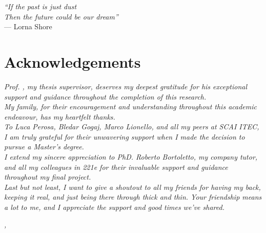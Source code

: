 \cleardoublepage
{}
{}

\begin{flushright}{
    \slshape
    ``If the past is just dust \\
    Then the future could be our dream''} \\
    \medskip
    --- Lorna Shore
\end{flushright}


\bigskip

\begingroup
\let\clearpage\relax
\let\cleardoublepage\relax
\let\cleardoublepage\relax

\chapter*{Acknowledgements}

\noindent \textit{Prof. \myProf, my thesis supervisor, deserves my deepest gratitude for his exceptional support and guidance throughout the completion of this research.}\\
\noindent \textit{My family, for their encouragement and understanding throughout this academic endeavour, has my heartfelt thanks.}\\
\noindent \textit{To Luca Perosa, Bledar Gogaj, Marco Lionello, and all my peers at SCAI ITEC, I am truly grateful for their unwavering support when I made the decision to pursue a Master’s degree.}\\
\noindent \textit{I extend my sincere appreciation to PhD. Roberto Bortoletto, my company tutor, and all my colleagues in 221e for their invaluable support and guidance throughout my final project.}\\
\noindent \textit{Last but not least, I want to give a shoutout to all my friends for having my back, keeping it real, and just being there through thick and thin. Your friendship means a lot to me, and I appreciate the support and good times we've shared.}\\
\bigskip

\noindent\textit{\myLocation, \myTime}
\hfill \myName

\endgroup
